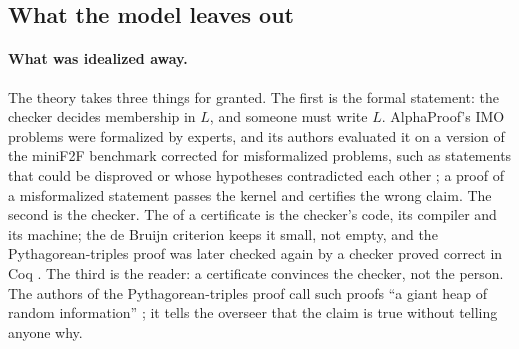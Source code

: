 \begin{refsection}
\section{What the model leaves out}\label{sec:certificates:leftout}

\paragraph{What was idealized away.} The theory takes three things for granted. The first is the formal statement: the checker decides membership in $L$, and someone must write $L$. AlphaProof's IMO problems were formalized by experts, and its authors evaluated it on a version of the miniF2F benchmark corrected for misformalized problems, such as statements that could be disproved or whose hypotheses contradicted each other \parencite{HubertEtAl2026}; a proof of a misformalized statement passes the kernel and certifies the wrong claim. The second is the checker. The  of a certificate is the checker's code, its compiler and its machine; the de Bruijn criterion keeps it small, not empty, and the Pythagorean-triples proof was later checked again by a checker proved correct in Coq \parencite{CruzFilipeEtAl2017}. The third is the reader: a certificate convinces the checker, not the person. The authors of the Pythagorean-triples proof call such proofs ``a giant heap of random information'' \parencite{HeuleKullmannMarek2016}; it tells the overseer that the claim is true without telling anyone why.


\end{refsection}

